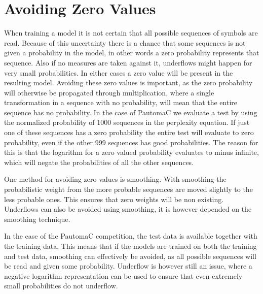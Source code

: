 \section{Avoiding Zero Values}

When training a model it is not certain that all possible sequences of symbols are read. Because of this uncertainty there is a chance that some sequences is not given a probability in the model, in other words a zero probability represents that sequence. Also if no measures are taken against it, underflows might happen for very small probabilities. In either cases a zero value will be present in the resulting model. Avoiding these zero values is important, as the zero probability will otherwise be propagated through multiplication, where a single transformation in a sequence with no probability, will mean that the entire sequence has no probability. In the case of PautomaC we evaluate a test by using the normalized probability of 1000 sequences in the perplexity equation. If just one of these sequences has a zero probability the entire test will evaluate to zero probability, even if the other 999 sequences has good probabilities. The reason for this is that the logarithm for a zero valued probability evaluates to minus infinite, which will negate the probabilities of all the other sequences.


One method for avoiding zero values is smoothing. With smoothing the probabilistic weight from the more probable sequences are moved slightly to the less probable ones. This ensures that zero weights will be non existing. Underflows can also be avoided using smoothing, it is however depended on the smoothing technique.


In the case of the PautomaC competition, the test data is available together with the training data. This means that if the models are trained on both the training and test data, smoothing can effectively be avoided, as all possible sequences will be read and given some probability. Underflow is however still an issue, where a negative logarithm representation can be used to ensure that even extremely small probabilities do not underflow.
